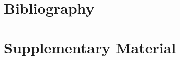 \documentclass[times, twoside, watermark]{zHenriquesLab-StyleBioRxiv}
\begin{document}
\section*{Bibliography}


\onecolumn
\newpage


\clearpage

\renewcommand{\thefigure}{S\arabic{figure}}
\setcounter{figure}{0}

\section*{Supplementary Material}
\end{document}
